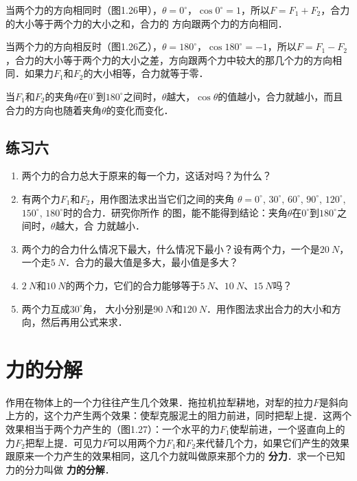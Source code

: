 当两个力的方向相同时（图1.26甲），$\theta =0^\circ$，$\cos 0^\circ=1$，所以$F=F_1+F_2$，合力的大小等于两个力的大小之和，合力的
方向跟两个力的方向相同．

当两个力的方向相反时（图1.26乙），$\theta =180^\circ$，$\cos 180^\circ=-1$，所以$F=F_1-F_2$，合力的大小等于两个力的大小之差，方向跟两个力中较大的那几个力的方向相同．如果力$F_1$和$F_2$的大小相等，合力就等于零．

当$F_1$和$F_2$的夹角$\theta$在$0^\circ$到$180^\circ$之间时，$\theta$越大，$\cos\theta$的值越小，合力就越小，而且合力的方向也随着夹角$\theta$的变化而变化．

\subsection*{练习六}
\begin{enumerate}
    \item 两个力的合力总大于原来的每一个力，这话对吗？为什么？
    \item 有两个力$F_1$和$F_2$，用作图法求出当它们之间的夹角
          $\theta =0^\circ$, $30^\circ$, $60^\circ$, $90^\circ$, $120^\circ$, $150^\circ$, $180^\circ$时的合力．研究你所作
          的图，能不能得到结论：夹角$\theta$在$0^\circ$到$180^\circ$之间时，$\theta $越大，合
          力就越小．
    \item 两个力的合力什么情况下最大，什么情况下最小？设有两个力，一个是$\qty{20}{N}$，一个走$\qty{5}{N}$．合力的最大值是多大，最小值是多大？
    \item $\qty{2}{N}$和$\qty{10}{N}$的两个力，它们的合力能够等于$\qty{5}{N}$、$\qty{10}{N}$、$\qty{15}{N}$吗？
    \item 两个力互成$30^\circ$角， 大小分别是$\qty{90}{N}$和$\qty{120}{N}$．用作图法求出合力的大小和方向，然后再用公式来求．
\end{enumerate}

\newpage

\section{力的分解}

作用在物体上的一个力往往产生几个效果．拖拉机拉犁耕地，对犁的拉力$F$是斜向上方的，这个力产生两个效果：使犁克服泥土的阻力前进，同时把犁上提．这两个效果相当于两个力产生的（图1.27）：一个水平的力$F_1$使犁前进，一个竖直向上的力$F_2$把犁上提．可见力$F$可以用两个力$F_1$和$F_2$来代替几个力，如果它们产生的效果跟原来一个力产生的效果相同，这几个力就叫做原来那个力的\textbf{ 分力}．求一个已知力的分力叫做\textbf{ 力的分解}．

